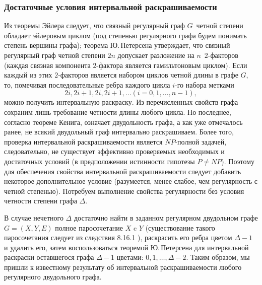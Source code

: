 \subsubsection{Достаточные условия интервальной раскрашиваемости}\label{subsec11}
 Из теоремы Эйлера %
  следует, что связный регулярный граф $G$\ четной степени обладает эйлеровым циклом (под степенью регулярного графа будем понимать степень вершины графа); теорема Ю.\,Петерсена \cite{akm-12Petersen} утверждает, что связный регулярный граф четной степени $2n$ допускает разложение на $n$\ $2$-факторов (каждая связная компонента $2$-фактора является гамильтоновым циклом). Если каждый из этих $2$-факторов является набором циклов четной длины в графе $G$, то, помечивая последовательные ребра каждого цикла $i$-го набора метками
$$
  2i,2i+1,2i,2i+1,...  (i=0,1,…,n-1),
$$
можно получить интервальную раскраску.
Из перечисленных свойств графа сохраним лишь требование четности длины любого цикла. Но последнее, согласно теореме Кенига, означает двудольность графа, а как уже отмечалось ранее, не всякий двудольный граф интервально раскрашиваем. Более того, проверка интервальной раскрашиваемости является $NP$-полной задачей, следовательно, не существует эффективно проверяемых необходимых и достаточных условий (в предположении истинности гипотезы $P\neq NP$). Поэтому для обеспечения свойства интервальной раскрашиваемости следует добавить некоторое дополнительное условие (разумеется, менее слабое, чем регулярность с четной степенью). Потребуем выполнение свойства регулярности без условия четности степени графа $\Delta$.
\par\medskip
В случае нечетного $\Delta$ достаточно найти в заданном регулярном двудольном графе $G=(X,Y,E)$ полное паросочетание $X$ c $Y$ (существование такого паросочетания следует из следствия 8.16.1 \cite[с.\,165]{akm-1}), раскрасить его ребра цветом $\Delta-1$ и удалить его, затем воспользоваться теоремой Ю.\,Петерсена для интервальной раскраски оставшегося графа $\Delta-1$ цветами: $0, 1, \dots, \Delta-2$. Таким образом, мы пришли к известному результату \cite{akm-9Kamal} об интервальной раскрашиваемости любого регулярного двудольного графа.
\par\medskip
